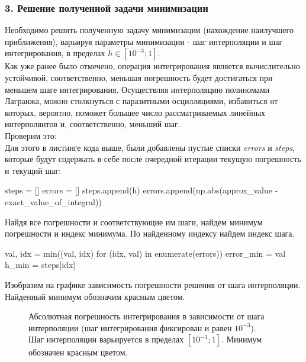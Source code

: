 \subsubsection{3. Решение полученной задачи минимизации}
Необходимо решить полученную задачу минимизации (нахождение наилучшего приближения), варьируя параметры минимизации - шаг интерполяции и шаг интегрирования, в пределах $h \in [10^{-3}; 1]$.\\
Как уже ранее было отмечено, операция интегрирования является вычислительно устойчивой, соответственно, меньшая погрешность будет достигаться при меньшем шаге интегрирования. Осуществляя интерполяцию полиномами Лагранжа, можно столкнуться с паразитными осцилляциями, избавиться от которых, вероятно, поможет большее число рассматриваемых линейных интерполянтов и, соответственно, меньший шаг.\\ 
Проверим это: \\
Для этого в листинге кода выше, были добавлены пустые списки \textit{errors} и \textit{steps}, которые будут содержать в себе после очередной итерации текущую погрешность и текущий шаг:
\begin{python}
steps = []
errors = []
steps.append(h)
errors.append(np.abs(approx_value - exact_value_of_integral))
\end{python}
Найдя все погрешности и соответствующие им шаги, найдем минимум погрешности и индекс минимума. По найденному индексу найдем индекс шага.
\begin{python}
val, idx = min((val, idx) for (idx, val) in enumerate(errors))
error_min = val
h_min = steps[idx]
\end{python}
Изобразим на графике зависимость погрешности решения от шага интерполяции. \\Найденный минимум обозначим красным цветом.
\begin{figure}[h]
\caption{Абсолютная погрешность интегрирования в зависимости от шага интерполяции (шаг интегрирования фиксирован и равен $10^{-3}$).\\ Шаг интерполяции варьируется в пределах $[10^{-3}; 1].$ Минимум обозначен красным цветом.}
\end{figure}
